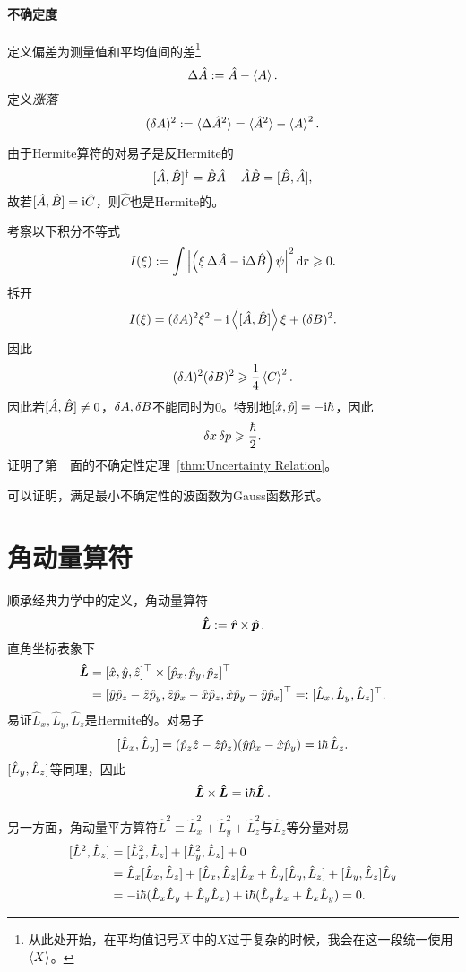 \paragraph{不确定度}定义偏差为测量值和平均值间的差\footnote{从此处开始，在平均值记号$\overline{X}$中的$X$过于复杂的时候，我会在这一段统一使用$\left\langle X\right\rangle$。}
\[
	\Delta\hat A:=\hat A-\left\langle A\right\rangle.
\]
定义\textit{涨落}
\[
	(\mathop{}\!\delta A)^2:=\langle\Delta\hat A^2\rangle=\langle\hat A^2\rangle-\left\langle A\right\rangle^2.
\]

由于Hermite算符的对易子是反Hermite的
\[
	[\hat A,\hat B]^\dagger=\hat B\hat A-\hat A\hat B=[\hat B,\hat A],
\]
故若$[\hat A,\hat B]=\mathrm{i}\hat C$，则$\hat C$也是Hermite的。

考察以下积分不等式
\[
I(\xi):=\int\left\lvert\left(\xi\,\Delta\hat A-\mathrm{i}\Delta\hat B\right)\psi\right\rvert^2\mathop{}\!\mathrm{d} r\geqslant 0.
\]
拆开
\[
I(\xi)=(\mathop{}\!\delta A)^2\xi^2-\mathrm{i}\left\langle [\hat A,\hat B]\right\rangle\xi+(\mathop{}\!\delta B)^2.
\]
因此
\begin{align}
	(\mathop{}\!\delta A)^2(\mathop{}\!\delta B)^2\geqslant\frac14\left\langle C\right\rangle^2.
\end{align}
因此若$[\hat A,\hat B]\neq 0$，$\mathop{}\!\delta A,\mathop{}\!\delta B$不能同时为0。特别地$[\hat x,\hat p]=-\mathrm{i}\hbar$，因此
\begin{align}
	\mathop{}\!\delta x\mathop{}\!\delta p\geqslant\frac{\hbar}2.\label{Proof of UR}
\end{align}
证明了第~\pageref{thm:Uncertainty Relation}~面的不确定性定理~\ref{thm:Uncertainty Relation}。

可以证明，满足最小不确定性的波函数为Gauss函数形式。
\section{角动量算符}
顺承经典力学中的定义，角动量算符
\[
	\bm{\hat L}\!\mathop{}:=\bm{\hat r}\!\mathop{}\times\,\bm{\hat p}\!\mathop{}.
\]
直角坐标表象下
\begin{align*}
	\qo L & =[\hat x,\hat y,\hat z]\tp\times[\hat p_x,\hat p_y,\hat p_z]\tp                             \\
	      & =\fkh{\hat y\hat p_z-\hat z\hat p_y,\hat z\hat p_x-\hat x\hat p_z,\hat x\hat p_y-\hat y\hat p_x}\tp %
	=:[\hat L_x,\hat L_y,\hat L_z]\tp.
\end{align*}
易证$\hat L_x,\hat L_y,\hat L_z$是Hermite的。对易子
\[
	[\hat L_x,\hat L_y]=(\hat p_z\hat z-\hat z\hat p_z)(\hat y\hat p_x-\hat x\hat p_y)=\mathrm{i}\hbar\,\hat L_z.
\]
$[\hat L_y,\hat L_z]$等同理，因此
\begin{align}
	\bm{\hat L}\!\mathop{}\times\,\bm{\hat L}\!\mathop{}=\mathrm{i}\hbar\bm{\hat L}\!\mathop{}.
\end{align}

另一方面，角动量平方算符$\hat L^2\equiv\hat L_x^2+\hat L_y^2+\hat L_z^2$与$\hat L_z$等分量对易
\begin{align}\notag
	[\hat L^2,\hat L_z]&=[\hat L^2_x,\hat L_z]+[\hat L^2_y,\hat L_z]+0\\\notag
	&=\hat L_x[\hat L_x,\hat L_z]+[\hat L_x,\hat L_z]\hat L_x+\hat L_y[\hat L_y,\hat L_z]+[\hat L_y,\hat L_z]\hat L_y\\
	&=-\mathrm{i}\hbar(\hat L_x\hat L_y+\hat L_y\hat L_x)+\mathrm{i}\hbar(\hat L_y\hat L_x+\hat L_x\hat L_y)=0.
\end{align}

